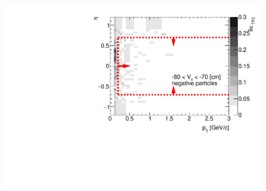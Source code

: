 \begin{figure}[H]\ContinuedFloat
	\vspace{-3.5em}
	\parbox{0.325\textwidth}{
		\includegraphics[width=\linewidth,page=32]{graphics/systematicsEfficiency/deadMaterial/secondaries_Unbinned_Charged_CD.pdf}\\
	}~
	\vspace{-4em}
\end{figure}
